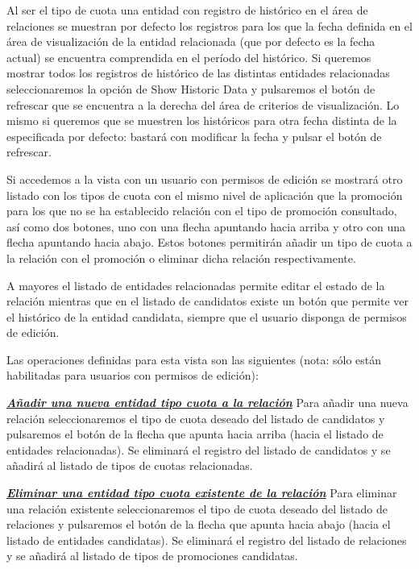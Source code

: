 Al ser el tipo de cuota una entidad con registro de histórico en el área de relaciones se muestran por defecto los registros para los que la fecha definida en el área de visualización de la entidad relacionada (que por defecto es la fecha actual) se encuentra comprendida en el período del histórico. Si queremos mostrar todos los registros de histórico de las distintas entidades relacionadas seleccionaremos la opción de Show Historic Data y pulsaremos el botón de refrescar que se encuentra a la derecha del área de criterios de visualización. Lo mismo si queremos que se muestren los históricos para otra fecha distinta de la especificada por defecto: bastará con modificar la fecha y pulsar el botón de refrescar.

Si accedemos a la vista con un usuario con permisos de edición se mostrará otro listado con los tipos de cuota con el mismo nivel de aplicación que la promoción para los que no se ha establecido relación con el tipo de promoción consultado, así como dos botones, uno con una flecha apuntando hacia arriba y otro con una flecha apuntando hacia abajo. Estos botones permitirán añadir un tipo de cuota a la relación con el promoción o eliminar dicha relación respectivamente. 

A mayores el listado de entidades relacionadas permite editar el estado de la relación mientras que en el listado de candidatos existe un botón que permite ver el histórico de la entidad candidata, siempre que el usuario disponga de permisos de edición.


Las operaciones definidas para esta vista son las siguientes (nota: sólo están habilitadas para usuarios con permisos de edición):

\underline{\textsl{\textbf{Añadir una nueva entidad tipo cuota a la relación}}} \newline
Para añadir una nueva relación seleccionaremos el tipo de cuota deseado del listado de candidatos y pulsaremos el botón de la flecha que apunta hacia arriba (hacia el listado de entidades relacionadas). Se eliminará el registro del listado de candidatos y se añadirá al listado de tipos de cuotas relacionadas.


\underline{\textsl{\textbf{Eliminar una entidad tipo cuota existente de la relación}}}\newline
Para eliminar una relación existente seleccionaremos el tipo de cuota deseado del listado de relaciones y pulsaremos el botón de la flecha que apunta hacia abajo (hacia el listado de entidades candidatas). Se eliminará el registro del listado de relaciones y se añadirá al listado de tipos de promociones candidatas.


